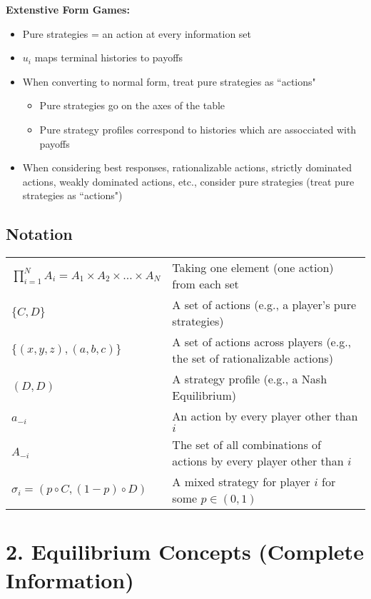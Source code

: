 \documentclass{report}
\renewcommand{\chaptermark}[1]{\markboth{#1}{}}
\begin{document}
\textbf{Extenstive Form Games:}
\begin{itemize}
	\item Pure strategies = an action at every information set
	\item $u_i$ maps terminal histories to payoffs
	\item When converting to normal form, treat pure strategies as ``actions"
		\begin{itemize}
			\item Pure strategies go on the axes of the table
			\item Pure strategy profiles correspond to histories which are assocciated with payoffs 
		\end{itemize}
	\item When considering best responses, rationalizable actions, strictly dominated actions, weakly dominated actions, etc., consider pure strategies (treat pure strategies as ``actions")
\end{itemize} \bigskip

\section*{Notation}\medskip

\begin{tabular}{@{} l l}
	$\prod_{i=1}^N A_i = A_1 \times A_2 \times \dots \times A_N$ \hspace{15pt} & Taking one element (one action) from each set\\[10pt]
	$\{C, D\}$ & A set of actions (e.g., a player's pure strategies)\\[10pt]
	$\{(x,y,z),(a,b,c)\}$ & A set of actions across players (e.g., the set of rationalizable actions)\\[10pt]
	$(D, D)$ & A strategy profile (e.g., a Nash Equilibrium)\\[10pt]
	$a_{-i}$ & An action by every player other than $i$\\[10pt]
	$A_{-i}$ & The set of all combinations of actions by every player other than $i$\\[10pt]
	$\sigma_i = (p \circ C, (1 - p) \circ D)$ & A mixed strategy for player $i$ for some $p \in (0,1)$
\end{tabular}

\chapter*{2. Equilibrium Concepts {\Large (Complete Information)}}
\thispagestyle{fancy}
\chaptermark{2. Equilibrium Concepts} \bigskip
\end{document}
